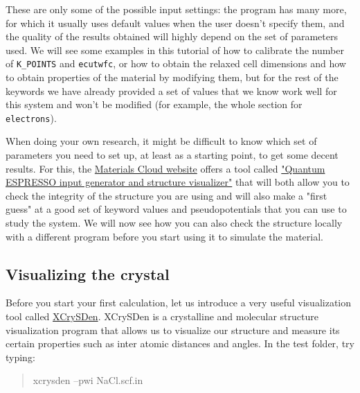 \documentclass[12pt]{article}
\newcommand{\code}[1]{
\begin{quotation}
  #1 
\end{quotation}
}
\begin{document}
These are only some of the possible input settings: the program has many more, for which it usually uses default values when the user doesn't specify them, and the quality of the results obtained will highly depend on the set of parameters used.
We will see some examples in this tutorial of how to calibrate the number of {\tt K\_POINTS} and {\tt ecutwfc}, or how to obtain the relaxed cell dimensions and how to obtain properties of the material by modifying them, but for the rest of the keywords we have already provided a set of values that we know work well for this system and won't be modified (for example, the whole section for {\tt electrons}).

When doing your own research, it might be difficult to know which set of parameters you need to set up, at least as a starting point, to get some decent results.
For this, the
\href{https://www.materialscloud.org/}{Materials Cloud website}
offers a tool called \href{
https://www.materialscloud.org/work/tools/qeinputgenerator}{"Quantum ESPRESSO input generator and structure visualizer"} that will both allow you to check the integrity of the structure you are using and will also make a "first guess" at a good set of keyword values and pseudopotentials that you can use to study the system.
We will now see how you can also check the structure locally with a different program before you start using it to simulate the material.


    \vspace{6mm}
    \subsection{Visualizing the crystal}

    Before you start your first calculation, let us introduce a very useful visualization
    tool called \href{http://www.xcrysden.org/}{XCrySDen}.
    XCrySDen is a crystalline and molecular structure visualization program that allows
    us to visualize our structure and measure its certain properties such as inter atomic
    distances and angles. In the test folder, try typing:

    \code{xcrysden --pwi  NaCl.scf.in}
\end{document}
